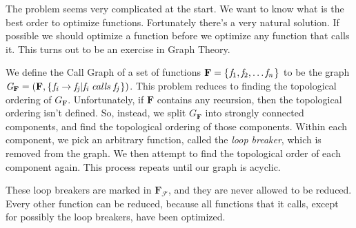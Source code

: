 \documentclass{book}
\theoremstyle{definition}
\newcommand{\Conid}[1]{\mathit{#1}}
\newcommand{\Varid}[1]{\mathit{#1}}
\begin{document}
The problem seems very complicated at the start.
We want to know what is the best order to optimize functions.
Fortunately there's a very natural solution.
If possible we should optimize a function before we optimize any function that calls it.
This turns out to be an exercise in Graph Theory.

We define the Call Graph of a set of functions \ensuremath{\textbf{F} \mathrel{=}\{\mskip1.5mu \Varid{f}_{\mathrm{1}},\Varid{f}_{\mathrm{2}},\ldots \Varid{f}_{\Varid{n}}\mskip1.5mu\}}
to be the graph \ensuremath{\Conid{G}_{\textbf{F} }\mathrel{=}(\textbf{F} ,\{\mskip1.5mu \Varid{f}_{\Varid{i}}\to \Varid{f}_{\Varid{j}} \vert \Varid{f}_{\Varid{i}}\;\Varid{calls}\;\Varid{f}_{\Varid{j}}\mskip1.5mu\})}.
This problem reduces to finding the topological ordering of \ensuremath{\Conid{G}_{\textbf{F} }}.
Unfortunately, if \ensuremath{\textbf{F} } contains any recursion, then the topological ordering isn't defined.
So, instead, we split \ensuremath{\Conid{G}_{\textbf{F} }} into strongly connected components, and find the topological ordering
of those components.
Within each component, we pick an arbitrary function, called the \emph{loop breaker},
which is removed from the graph.
We then attempt to find the topological order of each component again.
This process repeats until our graph is acyclic.

These loop breakers are marked in \ensuremath{\textbf{F} _\mathcal{F} }, and they are never allowed to be reduced.
Every other function can be reduced, because all functions that it calls,
except for possibly the loop breakers, have been optimized.
\end{document}
